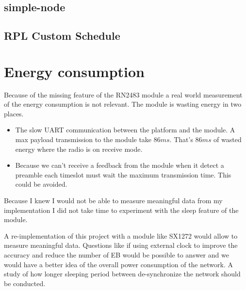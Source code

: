 \subsection{simple-node}

\subsection{RPL Custom Schedule}



\section{Energy consumption}

Because of the missing feature of the RN2483 module a real world measurement of
the energy consumption is not relevant.
The module is wasting energy in two places.

\begin{itemize}
  \item The slow UART communication between the platform and the module. A max 
    payload transmission to the module take $86 ms$.  That's $86 ms$ of wasted 
    energy where the radio is on receive mode.
  \item Because we can't receive a feedback from the module when it detect a
    preamble each timeslot must wait the maximum transmission time. This could
    be avoided.
\end{itemize}

Because I knew I would not be able to measure meaningful data from my
implementation I did not take time to experiment with the sleep feature of the
module.


A re-implementation of this project with a module like SX1272 would allow to
measure meaningful data.
Questions like if using external clock to improve the accuracy and reduce the
number of EB would be possible to answer and we would have a better idea of the
overall power consumption of the network.
A study of how longer sleeping period between de-synchronize the network should
be conducted.
